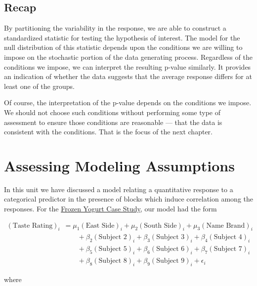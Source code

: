 \documentclass[]{book}
\theoremstyle{plain}
\theoremstyle{mydefn}
\theoremstyle{myexmpl}
\theoremstyle{remark}
\begin{document}
\section{Recap}\label{recap-4}

By partitioning the variability in the response, we are able to
construct a standardized statistic for testing the hypothesis of
interest. The model for the null distribution of this statistic depends
upon the conditions we are willing to impose on the stochastic portion
of the data generating process. Regardless of the conditions we impose,
we can interpret the resulting p-value similarly. It provides an
indication of whether the data suggests that the average response
differs for at least one of the groups.

Of course, the interpretation of the p-value depends on the conditions
we impose. We should not choose such conditions without performing some
type of assessment to ensure those conditions are reasonable --- that
the data is consistent with the conditions. That is the focus of the
next chapter.

\chapter{Assessing Modeling Assumptions}\label{Blockassessment}

In this unit we have discussed a model relating a quantitative response
to a categorical predictor in the presence of blocks which induce
correlation among the responses. For the
\protect\hyperlink{CaseYogurt}{Frozen Yogurt Case Study}, our model had
the form

\[
\begin{aligned}
  (\text{Taste Rating})_i &= \mu_1 (\text{East Side})_i + \mu_2 (\text{South Side})_i + \mu_3 (\text{Name Brand})_i \\
    &\qquad + \beta_2 (\text{Subject 2})_i + \beta_3 (\text{Subject 3})_i + \beta_4 (\text{Subject 4})_i \\
    &\qquad + \beta_5 (\text{Subject 5})_i + \beta_6 (\text{Subject 6})_i + \beta_7 (\text{Subject 7})_i \\
    &\qquad + \beta_8 (\text{Subject 8})_i + \beta_9 (\text{Subject 9})_i + \epsilon_i
\end{aligned}
\]

where
\end{document}
